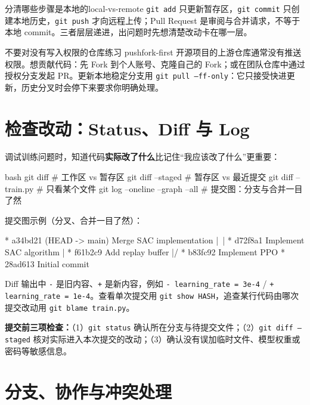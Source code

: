 \documentclass[12pt,a4paper]{ctexart}
\begin{document}
	\begin{example}{分清哪些步骤是本地的}{local-vs-remote}
		\texttt{git add} 只更新暂存区，\texttt{git commit} 只创建本地历史，\texttt{git push} 才向远程上传；Pull Request 是审阅与合并请求，不等于本地 commit。三者层层递进，出问题时先想清楚改动卡在哪一层。
	\end{example}

	\begin{warning}{不要对没有写入权限的仓库练习 push}{fork-first}
		开源项目的上游仓库通常没有推送权限。想贡献代码：先 Fork 到个人账号、克隆自己的 Fork；或在团队仓库中通过授权分支发起 PR。更新本地稳定分支用 \texttt{git pull --ff-only}：它只接受快进更新，历史分叉时会停下来要求你明确处理。
	\end{warning}

	\section{检查改动：Status、Diff 与 Log}

	调试训练问题时，知道代码\textbf{实际改了什么}比记住``我应该改了什么''更重要：

	\begin{codeblock}{bash}
git diff                 # 工作区 vs 暂存区
git diff --staged        # 暂存区 vs 最近提交
git diff -- train.py     # 只看某个文件
git log --oneline --graph --all   # 提交图：分支与合并一目了然
	\end{codeblock}

	提交图示例（分叉、合并一目了然）：

	\begin{codeblock}{}
* a34bd21 (HEAD -> main) Merge SAC implementation
|\
| * d72f8a1 Implement SAC algorithm
| * f61b2c9 Add replay buffer
|/
* b83fc92 Implement PPO
* 28ad613 Initial commit
	\end{codeblock}

	Diff 输出中 \texttt{-} 是旧内容、\texttt{+} 是新内容，例如 \texttt{- learning\_rate = 3e-4} / \texttt{+ learning\_rate = 1e-4}。查看单次提交用 \texttt{git show HASH}，追查某行代码由哪次提交改动用 \texttt{git blame train.py}。

	\textbf{提交前三项检查：}（1）\texttt{git status} 确认所在分支与待提交文件；（2）\texttt{git diff --staged} 核对实际进入本次提交的改动；（3）确认没有误加临时文件、模型权重或密码等敏感信息。

	\section{分支、协作与冲突处理}
\end{document}
